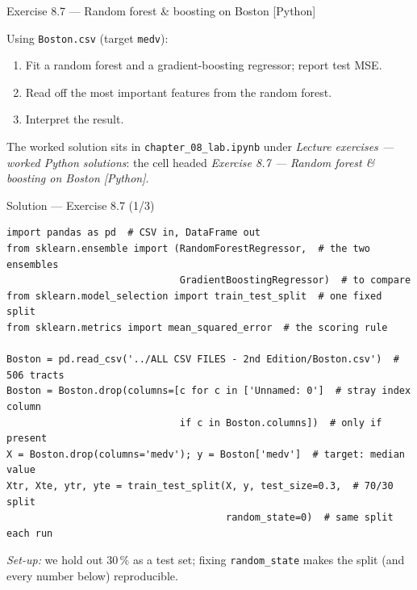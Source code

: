 \documentclass[aspectratio=169,11pt]{beamer}
\begin{document}
\begin{frame}[fragile]{Exercise 8.7 --- Random forest \& boosting on Boston [Python]}
\begin{exercise}
Using \texttt{Boston.csv} (target \texttt{medv}):
\begin{enumerate}
  \item Fit a random forest and a gradient-boosting regressor; report test MSE.
  \item Read off the most important features from the random forest.
  \item Interpret the result.
\end{enumerate}
\end{exercise}
\begin{labnote}
The worked solution sits in \texttt{chapter\_08\_lab.ipynb} under \emph{Lecture exercises --- worked Python solutions}: the cell headed \emph{Exercise 8.7 --- Random forest \& boosting on Boston [Python]}.
\end{labnote}
\end{frame}

\begin{frame}[fragile]{Solution --- Exercise 8.7 (1/3)}
\begin{solutionbox}
\begin{lstlisting}
import pandas as pd  # CSV in, DataFrame out
from sklearn.ensemble import (RandomForestRegressor,  # the two ensembles
                              GradientBoostingRegressor)  # to compare
from sklearn.model_selection import train_test_split  # one fixed split
from sklearn.metrics import mean_squared_error  # the scoring rule

Boston = pd.read_csv('../ALL CSV FILES - 2nd Edition/Boston.csv')  # 506 tracts
Boston = Boston.drop(columns=[c for c in ['Unnamed: 0']  # stray index column
                              if c in Boston.columns])  # only if present
X = Boston.drop(columns='medv'); y = Boston['medv']  # target: median value
Xtr, Xte, ytr, yte = train_test_split(X, y, test_size=0.3,  # 70/30 split
                                      random_state=0)  # same split each run
\end{lstlisting}
\emph{Set-up:} we hold out $30\,\%$ as a test set; fixing \texttt{random\_state} makes the split (and every number below) reproducible.
\end{solutionbox}
\end{frame}
\end{document}

